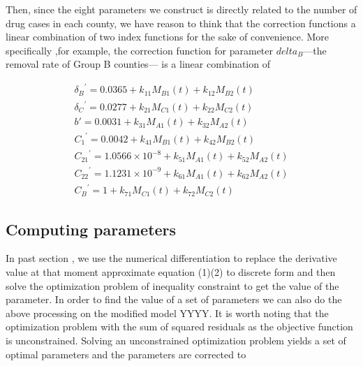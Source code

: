 \documentclass{mcmthesis}
\begin{document}
Then, since the eight parameters we construct is directly related to the number of drug cases in each county, we have reason to think that the correction functions a linear combination of two index functions for the sake of convenience. More specifically ,for example, the correction function for parameter ${delta _B}$---the removal rate of Group B counties--- is a linear combination of  

\begin{equation}
	\begin{array}{l}
{\delta _B}^\prime  = 0.0365 + {k_{11}}{M_{B1}}(t) + {k_{12}}{M_{B2}}(t)\\
{\delta _C}^\prime  = 0.0277 + {k_{21}}{M_{C1}}(t) + {k_{22}}{M_{C2}}(t)\\
b' = 0.0031 + {k_{31}}{M_{A1}}(t) + {k_{32}}{M_{A2}}(t)\\
{C_1}^\prime  = 0.0042 + {k_{41}}{M_{B1}}(t) + {k_{42}}{M_{B2}}(t)\\
{C_{21}}^\prime  = 1.0566 \times {10^{ - 8}} + {k_{51}}{M_{A1}}(t) + {k_{52}}{M_{A2}}(t)\\
{C_{22}}^\prime  = 1.1231 \times {10^{ - 9}} + {k_{61}}{M_{A1}}(t) + {k_{62}}{M_{A2}}(t)\\
{C_B}^\prime  = 1 + {k_{71}}{M_{C1}}(t) + {k_{72}}{M_{C2}}(t)
\end{array}
\end{equation}
%
%
%
\subsection{Computing parameters}
In past section , we use the numerical differentiation to replace the derivative value at that moment approximate equation (1)(2) to discrete form and then solve the optimization problem of inequality constraint to get the value of the parameter.  In order to find the value of a set of parameters we can also do the above processing on the modified model YYYY. It is worth noting that the optimization problem with the sum of squared residuals as the objective function is unconstrained.  Solving an unconstrained optimization problem yields a set of optimal parameters and the parameters are corrected to
\end{document}
